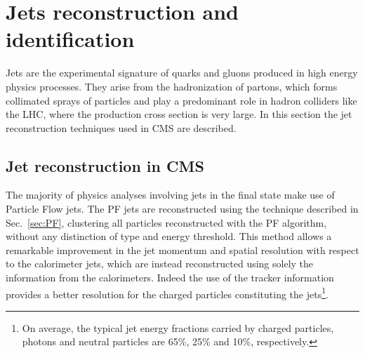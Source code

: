 \section{Jets reconstruction and identification}\label{sec:jets}

Jets are the experimental signature of quarks and gluons produced in high energy physics processes. They arise from the hadronization of partons, which forms collimated sprays of particles and play a predominant role in hadron colliders like the LHC, where the production cross section is very large. In this section the jet reconstruction techniques used in CMS are described.

\subsection{Jet reconstruction in CMS}

The majority of physics analyses involving jets in the final state make use of Particle Flow jets. The PF jets are reconstructed using the technique described in Sec.~\ref{sec:PF}, clustering all particles reconstructed with the PF algorithm, without any distinction of type and energy threshold. This method allows a remarkable improvement in the jet momentum and spatial resolution with respect to the calorimeter jets, which are instead reconstructed using solely the information from the calorimeters. Indeed the use of the tracker information provides a better \pt resolution for the charged particles constituting the jets\footnote{On average, the typical jet energy fractions carried by charged particles, photons and neutral particles are 65\%, 25\% and 10\%, respectively.}. 

